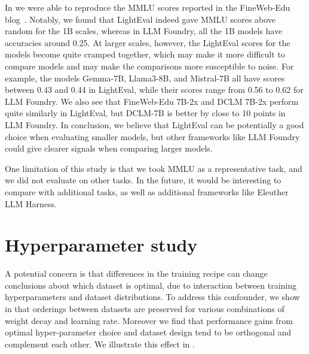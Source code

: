 \documentclass{article}
\newcommand{\hqpool}{\textsc{DCLM-baseline}\xspace}
\newcommand{\strack}{\texttt{1B-1x}\xspace}
\newcommand{\cfour}{\texttt{C4}\xspace}
\newcommand{\rpj}{\texttt{RedPajama}\xspace}
\begin{document}
In  we were able to reproduce the MMLU scores reported in the FineWeb-Edu blog~\citep{lozhkov2024fineweb-edu}.
Notably, we found that LightEval indeed gave MMLU scores above random for the 1B scales, whereas in LLM Foundry, all the 1B models have accuracies around 0.25.
At larger scales, however, the LightEval scores for the models become quite cramped together, which may make it more difficult to compare models and may make the comparisons more susceptible to noise.
For example, the models Gemma-7B, Llama3-8B, and Mistral-7B all have scores between 0.43 and 0.44 in LightEval, while their scores range from 0.56 to 0.62 for LLM Foundry.
We also see that FineWeb-Edu 7B-2x and DCLM 7B-2x perform quite similarly in LightEval, but DCLM-7B is better by close to 10 points in LLM Foundry.
In conclusion, we believe that LightEval can be potentially a good choice when evaluating smaller models, but other frameworks like LLM Foundry could give clearer signals when comparing larger models.

One limitation of this study is that we took MMLU as a representative task, and we did not evaluate on other tasks. In the future, it would be interesting to compare with additional tasks, as well as additional frameworks like Eleuther LLM Harness.



\section{Hyperparameter study}\label{appx:hp-ablations}
A potential concern is that differences in the training recipe can change conclusions about which dataset is optimal, due to interaction between training hyperparameters and dataset distributions.
To address this confounder, we show in  that orderings between datasets are preserved for various combinations of weight decay and learning rate.
Moreover we find that performance gains from optimal hyper-parameter choice and dataset design tend to be orthogonal and complement each other. We illustrate this effect in .

\begin{table}[t]
    \centering
    \caption{\textbf{Rankings are stable across hyperparameters} (\strack{} scale). We train models on 3 datasets with 5 hyperparameter settings, varying learning rate and weight decay settings. Across the hyperparameter settings, the dataset ranking remains largely stable, with \hqpool outperforming \rpj, which in turns outperforms \cfour. With improved hyperparameters, the gaps between the datasets grows: e.g., at `Default' (the best hyperparameter setting), \hqpool outperforms \rpj by 4.5 points and \rpj outperforms \cfour by 2 points, while at `\texttt{0.1x} Learning Rate' (the lowest performing setting), the gaps reduce to 3.3 points and 0.9 points respectively. Note: When changing learning rate, we also update weight decay so the product of the two remains the same.}
    \resizebox{\linewidth}{!}{
    
    }
    \label{tab:hparam-rankings}
\end{table}
\end{document}
